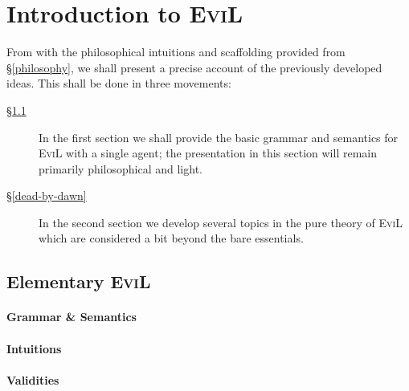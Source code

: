 \documentclass[11pt,titlepage]{report}
\numberwithin{equation}{subsection}
\renewcommand\subsection{\section}
\begin{document}
\chapter{Introduction to \textsc{EviL}}\label{evil-semantics}
From with the philosophical intuitions and scaffolding provided from
\S\ref{philosophy}, we shall present a precise account of the previously
developed ideas.  This shall be done in three movements:
\begin{description}
 \item[\S\ref{basic-evil}]  In the first section we shall provide the
   basic grammar and semantics for \textsc{EviL} with a single agent;
   the presentation in this section will remain primarily
   philosophical and light.
 \item[\S\ref{dead-by-dawn}]  In the second section we develop several
   topics in the pure theory of \textsc{EviL} which are considered a bit
   beyond the bare essentials.
\end{description}


\subsection{Elementary \textsc{EviL}}\label{basic-evil}
\subsubsection{Grammar \& Semantics}\label{evil-grammar}

\subsubsection{Intuitions}\label{evil-intuition}

\subsubsection{Validities}
\label{validities}

\end{document}
